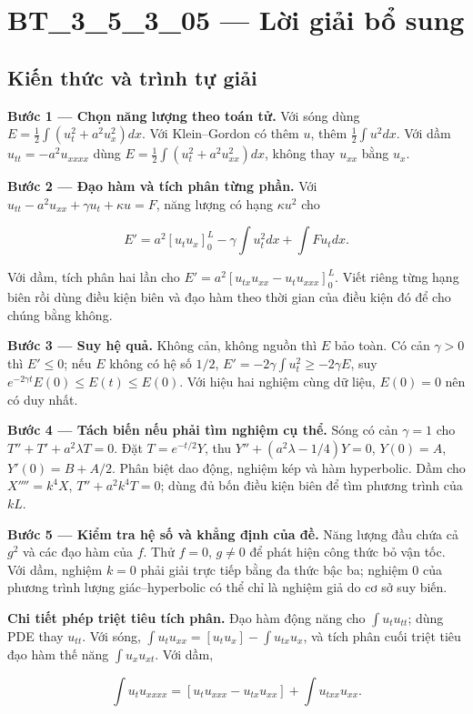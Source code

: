\documentclass[10pt,a4paper]{article}
\begin{document}
\section*{BT\_3\_5\_3\_05 — Lời giải bổ sung}
\subsection*{Kiến thức và trình tự giải}
\textbf{Bước 1 — Chọn năng lượng theo toán tử.} Với sóng dùng $E=\frac12\int(u_t^2+a^2u_x^2)dx$. Với Klein–Gordon có thêm $u$, thêm $\frac12\int u^2dx$. Với dầm $u_{tt}=-a^2u_{xxxx}$ dùng $E=\frac12\int(u_t^2+a^2u_{xx}^2)dx$, không thay $u_{xx}$ bằng $u_x$.

\textbf{Bước 2 — Đạo hàm và tích phân từng phần.} Với $u_{tt}-a^2u_{xx}+\gamma u_t+\kappa u=F$, năng lượng có hạng $\kappa u^2$ cho


\[
E'=a^2[u_tu_x]_0^L-\gamma\int u_t^2dx+\int Fu_tdx.
\]


Với dầm, tích phân hai lần cho $E'=a^2[u_{tx}u_{xx}-u_tu_{xxx}]_0^L$. Viết riêng từng hạng biên rồi dùng điều kiện biên và đạo hàm theo thời gian của điều kiện đó để cho chúng bằng không.

\textbf{Bước 3 — Suy hệ quả.} Không cản, không nguồn thì $E$ bảo toàn. Có cản $\gamma>0$ thì $E'\le0$; nếu $E$ không có hệ số $1/2$, $E'=-2\gamma\int u_t^2\ge-2\gamma E$, suy $e^{-2\gamma t}E(0)\le E(t)\le E(0)$. Với hiệu hai nghiệm cùng dữ liệu, $E(0)=0$ nên có duy nhất.

\textbf{Bước 4 — Tách biến nếu phải tìm nghiệm cụ thể.} Sóng có cản $\gamma=1$ cho $T''+T'+a^2\lambda T=0$. Đặt $T=e^{-t/2}Y$, thu $Y''+(a^2\lambda-1/4)Y=0$, $Y(0)=A$, $Y'(0)=B+A/2$. Phân biệt dao động, nghiệm kép và hàm hyperbolic. Dầm cho $X''''=k^4X$, $T''+a^2k^4T=0$; dùng đủ bốn điều kiện biên để tìm phương trình của $kL$.

\textbf{Bước 5 — Kiểm tra hệ số và khẳng định của đề.} Năng lượng đầu chứa cả $g^2$ và các đạo hàm của $f$. Thử $f=0$, $g\ne0$ để phát hiện công thức bỏ vận tốc. Với dầm, nghiệm $k=0$ phải giải trực tiếp bằng đa thức bậc ba; nghiệm $0$ của phương trình lượng giác–hyperbolic có thể chỉ là nghiệm giả do cơ sở suy biến.

\textbf{Chi tiết phép triệt tiêu tích phân.} Đạo hàm động năng cho $\int u_tu_{tt}$; dùng PDE thay $u_{tt}$. Với sóng, $\int u_tu_{xx}=[u_tu_x]-\int u_{tx}u_x$, và tích phân cuối triệt tiêu đạo hàm thế năng $\int u_xu_{xt}$. Với dầm,


\[
\int u_tu_{xxxx}=[u_tu_{xxx}-u_{tx}u_{xx}]+\int u_{txx}u_{xx}.
\]
\end{document}
